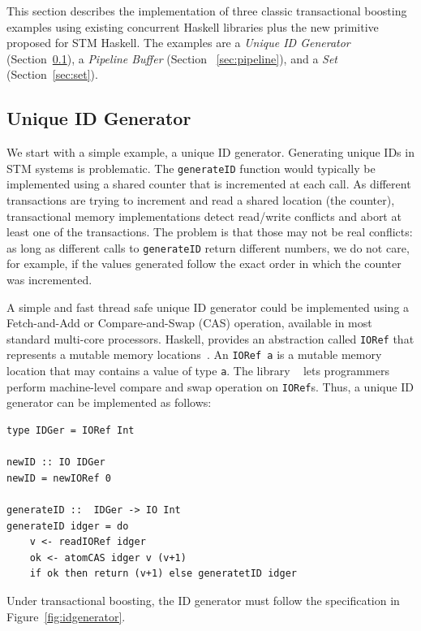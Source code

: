 \documentclass{llncs}
\begin{document}
This section describes the implementation of three classic transactional boosting examples
using existing concurrent Haskell libraries plus the new
primitive proposed for STM Haskell. The examples are a {\it Unique ID Generator} (Section~\ref{sec:uniqueid}),
a {\it Pipeline Buffer} (Section ~\ref{sec:pipeline}), and a {\it Set} (Section~\ref{sec:set}).



\subsection{Unique ID Generator}
\label{sec:uniqueid}

We start with a simple example, a unique ID generator. Generating unique
IDs in STM systems is problematic. %
The {\tt generateID} function would typically be implemented using a shared counter that
is incremented at each call. 
As different transactions are trying to increment and read a shared location (the counter),
transactional memory implementations detect read/write conflicts and
abort at least one of the transactions. 
The problem is that those may not be real conflicts: as long as different calls to {\tt generateID}
return different numbers, we do not care, for example, if the values generated follow the exact order
in which the counter was incremented.

A simple and fast thread safe unique ID generator could be
implemented using a Fetch-and-Add or Compare-and-Swap (CAS) operation, available
in most standard multi-core processors. Haskell, provides an abstraction
called {\tt IORef} that represents a mutable
memory locations~\cite{tackling}. An {\tt IORef a} is a mutable memory location that may contains a value of type
{\tt a}. The 
 library ~\cite{casioref} lets programmers perform machine-level compare and swap operation on {\tt IORef}s.
Thus, a unique ID generator can be implemented as follows:

{\small\begin{verbatim}
type IDGer = IORef Int

newID :: IO IDGer
newID = newIORef 0

generateID ::  IDGer -> IO Int
generateID idger = do
    v <- readIORef idger
    ok <- atomCAS idger v (v+1)
    if ok then return (v+1) else generatetID idger
\end{verbatim}}

Under transactional boosting, the ID generator must follow the specification
in Figure~\ref{fig:idgenerator}.
\end{document}
